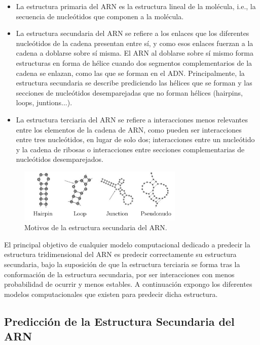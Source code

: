 \documentclass[a4paper,11pt,titlepage]{article}
\theoremstyle{definition}
\begin{document}
\begin{itemize}
    \item La estructura primaria del ARN es la estructura lineal de la molécula, i.e., la secuencia de nucleótidos que componen a la molécula.
    \item La estructura secundaria del ARN se refiere a los enlaces que los diferentes nucleótidos de la cadena presentan entre sí, y como esos enlaces fuerzan a la cadena a doblarse sobre sí misma. El ARN al doblarse sobre sí mismo forma estructuras en forma de hélice cuando dos segmentos complementarios de la cadena se enlazan, como las que se forman en el ADN. Principalmente, la estructura secundaria se describe prediciendo las hélices que se forman y las secciones de nucleótidos desemparejadas que no forman hélices (hairpins, loops, juntions...).
    \item La estructura terciaria del ARN se refiere a interacciones menos relevantes entre los elementos de la cadena de ARN, como pueden ser interacciones entre tres nucleótidos, en lugar de solo dos; interacciones entre un nucleótido y la cadena de ribosas o interacciones entre secciones complementarias de nucleótidos desemparejados.
\end{itemize}

\begin{figure}[H]
    \centering
    \includegraphics[width=0.70\textwidth]{images/RNA_secondary_structure.png}
    \caption{Motivos de la estructura secundaria del ARN.}
    \label{fig:RNA_secondary_structure}
\end{figure}

El principal objetivo de cualquier modelo computacional dedicado a predecir la estructura tridimensional del ARN es predecir correctamente su estructura secundaria, bajo la suposición de que la estructura terciaria se forma tras la conformación de la estructura secundaria, por ser interacciones con menos probabilidad de ocurrir y menos estables. A continuación expongo los diferentes modelos computacionales que existen para predecir dicha estructura.

\subsection{Predicción de la Estructura Secundaria del ARN}\label{subsubsec:thbasis}
\end{document}
